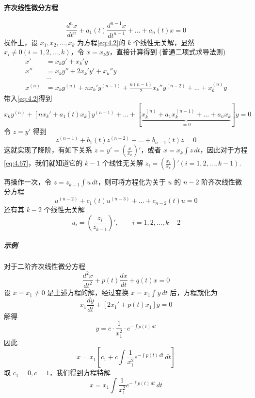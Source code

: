 \paragraph{齐次线性微分方程}
\begin{equation}
    \frac{d^{n}x}{dt^{n}}+a_{1}(t)\frac{d^{n-1}x}{dt^{n-1}}+\dots+a_{n}(t)x=0
    \label{eq:4.2}
\end{equation}
操作上，设 $\displaystyle x_{1},x_{2},\dots,x_{k}$ 为方程\ref{eq:4.2}的 $k$ 个线性无关解，显然 $\displaystyle x_{i}\neq0(i=1,2,\dots,k)$，令 $\displaystyle x=x_{k}y$，直接计算得到 (普通二项式求导法则)
$$
    \begin{aligned}
        x'      & =x_{k}y'+x_{k}'y                                                                   \\
        x''     & =x_{k}y''+2x_{k}'y'+x_{k}''y                                                       \\
                & \dots                                                                              \\
        x^{(n)} & =x_{k}y^{(n)}+nx_{k}'y^{(n-1)}+\frac{n(n-1)}{2}x_{k}''y^{(n-2)}+\dots+x_{k}^{(n)}y
    \end{aligned}
$$
带入\ref{eq:4.2}得到
$$
    x_{k}y^{(n)}+[nx_{k}'+a_{1}(t)x_{k}]y^{(n-1)}+\dots+[ \underbrace{ x_{k}^{(n)}+a_{1}x_{k}^{(n-1)}+\dots+a_{n}x_{k} }_{ =0 } ]y=0
$$
令 $\displaystyle z=y'$ 得到
\begin{equation}
    z^{(n-1)}+b_{1}(t)z^{(n-2)}+\dots+b_{n-1}(t)z=0
    \label{eq:4.67}
\end{equation}
这就实现了降阶，有如下关系 $\displaystyle z=y'=\left( \frac{x}{x_{k}} \right)'$，或者 $\displaystyle x=x_{k}\int z \, dt$，因此对于方程\ref{eq:4.67}，我们就知道它的 $\displaystyle k-1$ 个线性无关解 $\displaystyle z_{i}=\left( \frac{x_{i}}{x_{k}} \right)'(i=1,2,\dots,k-1)$.

再操作一次，令 $\displaystyle z=z_{k-1}\int u \, dt$，则可将方程化为关于 $u$ 的 $\displaystyle n-2$ 阶齐次线性微分方程
$$
    u^{(n-2)}+c_{1}(t)u^{(n-3)}+\dots+c_{n-2}(t)u=0
$$
还有其 $\displaystyle k-2$ 个线性无关解
$$
    u_{i}=\left( \frac{z_{i}}{z_{k-1}} \right)',\qquad i=1,2,\dots,k-2
$$
\subparagraph{示例}
对于二阶齐次线性微分方程
$$
    \frac{d^{2}x}{dt^{2}}+p(t)\frac{dx}{dt}+q(t)x=0
$$
设 $\displaystyle x=x_{1}\neq0$ 是上述方程的解，经过变换 $\displaystyle x=x_{1}\int y \, dt$ 后，方程就化为
$$
    x_{1}\frac{dy}{dt}+[2x_{1}'+p(t)x_{1}]y=0
$$
解得
$$
    y=c\cdot\frac{1}{x_{1}^{2}}\cdot e^{ -\int p(t) \, dt  }
$$
因此
$$
    x=x_{1}\left[ c_{1}+c\int \frac{1}{x_{1}^{2}} e^{ -\int p(t) \, dt  } \, dt  \right]
$$
取 $\displaystyle c_{1}=0,c=1$，我们得到方程特解
$$
    x=x_{1}\int \frac{1}{x_{1}^{2}}e^{ -\int p(t) \, dt  } \, dt
$$
